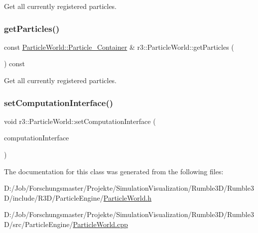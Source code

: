 Get all currently registered particles. \mbox{\label{classr3_1_1_particle_world_ab816d6bca8b42fdf16170275087008f0}} 
\subsubsection{\texorpdfstring{get\+Particles()}{getParticles()}\hspace{0.1cm}{\footnotesize\ttfamily [2/2]}}
{\footnotesize\ttfamily const \mbox{\hyperlink{classr3_1_1_particle_world_aa354f6786c0837674fe8286f00465631}{Particle\+World\+::\+Particle\+\_\+\+Container}} \& r3\+::\+Particle\+World\+::get\+Particles (\begin{DoxyParamCaption}{ }\end{DoxyParamCaption}) const}

Get all currently registered particles. \mbox{\label{classr3_1_1_particle_world_adf5630d53659e9ced254d33990f15a9d}} 
\subsubsection{\texorpdfstring{set\+Computation\+Interface()}{setComputationInterface()}}
{\footnotesize\ttfamily void r3\+::\+Particle\+World\+::set\+Computation\+Interface (\begin{DoxyParamCaption}\item[{\mbox{\hyperlink{classr3_1_1_particle_engine_c_i}{Particle\+Engine\+CI}} $\ast$}]{computation\+Interface }\end{DoxyParamCaption})}



The documentation for this class was generated from the following files\+:\begin{DoxyCompactItemize}
\item 
D\+:/\+Job/\+Forschungsmaster/\+Projekte/\+Simulation\+Visualization/\+Rumble3\+D/\+Rumble3\+D/include/\+R3\+D/\+Particle\+Engine/\mbox{\hyperlink{_particle_world_8h}{Particle\+World.\+h}}\item 
D\+:/\+Job/\+Forschungsmaster/\+Projekte/\+Simulation\+Visualization/\+Rumble3\+D/\+Rumble3\+D/src/\+Particle\+Engine/\mbox{\hyperlink{_particle_world_8cpp}{Particle\+World.\+cpp}}\end{DoxyCompactItemize}
